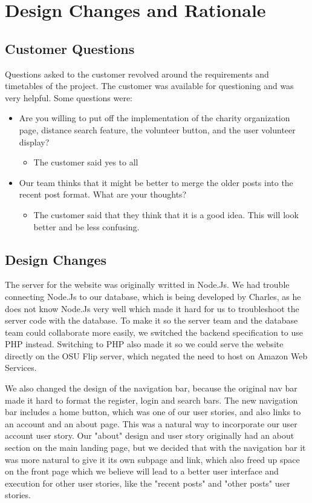 \documentclass[12pt]{article}
\begin{document}
\section{Design Changes and Rationale}
\subsection{Customer Questions}
	Questions asked to the customer revolved around the requirements and
	timetables of the project. The customer was available for questioning and was
	very helpful. Some questions were:
\begin{itemize}
\item
	Are you willing to put off the implementation of the charity organization page,
	distance search feature, the volunteer button, and the user volunteer display?
	\begin{itemize}
	\item
		The customer said yes to all
	\end{itemize}
\item
	Our team thinks that it might be better to merge the older posts into the
	recent post format. What are your thoughts?
	\begin{itemize}
	\item
		The customer said that they think that it is a good idea. This will
		look better and be less confusing.
	\end{itemize}
\end{itemize}
\subsection{Design Changes}
	The server for the website was originally writted in Node.Js. We had trouble
	connecting Node.Js to our database, which is being developed by Charles, as he
	does not know Node.Js very well which made it hard for us to troubleshoot the
	server code with the database. To make it so the server team and the database
	team could collaborate more easily, we switched the backend specification to
	use PHP instead. Switching to PHP also made it so we could serve the website
	directly on the OSU Flip server, which negated the need to host on Amazon Web
	Services.

	We also changed the design of the navigation bar, because the original nav bar
	made it hard to format the register, login and search bars. The new navigation
	bar includes a home button, which was one of our user stories, and also links to
	an account and an about page. This was a natural way to incorporate our
	user account user story. Our "about" design and user story originally had an
	about section on the main landing page, but we decided that with the navigation
	bar it was more natural to give it its own subpage and link, which also freed up
	space on the front page which we believe will lead to a better user interface and
	execution for other user stories, like the "recent posts" and "other posts" user
	stories.
\end{document}
